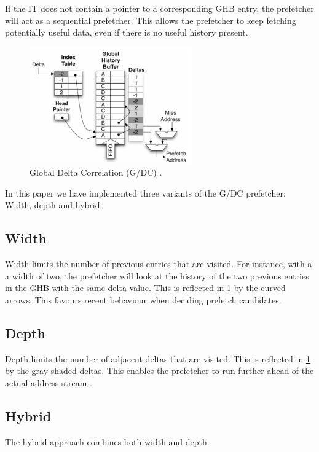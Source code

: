 \documentclass[conference]{IEEEtran}
\begin{document}
If the IT does not contain a pointer to a corresponding GHB entry, the prefetcher will act as a sequential prefetcher. This allows the prefetcher to keep fetching potentially useful data, even if there is no useful history present.

\begin{figure}[H]
    \centering
    \vspace{-2mm}
     \includegraphics[width=7cm]{assets/gdc.png}
    \vspace{-2mm}
    \caption{Global Delta Correlation (G/DC) \cite{b1}.}
    \label{fig:GDC}
\end{figure}

In this paper we have implemented three variants of the G/DC prefetcher: Width, depth and hybrid. 

\subsection{Width}
Width limits the number of previous entries that are visited. For instance, with a a width of two, the prefetcher will look at the history of the two previous entries in the GHB with the same delta value. This is reflected in \cref{fig:GDC} by the curved arrows. This favours recent behaviour when deciding prefetch candidates. 

\subsection{Depth}
Depth limits the number of adjacent deltas that are visited. This is reflected in \cref{fig:GDC} by the gray shaded deltas. This enables the prefetcher to run further ahead of the actual address stream \cite{address_stream}. 

\subsection{Hybrid}
The hybrid approach combines both width and depth.

\end{document}
